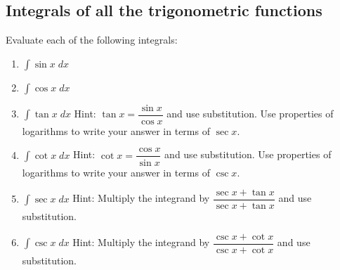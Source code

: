 \documentclass[12pt,letterpaper,fleqn]{article}
\theoremstyle{definition}
\begin{document}
\subsection*{Integrals of all the trigonometric functions}
Evaluate each of the following integrals:
\begin{enumerate}[resume]
  \item $\int\sin x\;dx$
  \item $\int\cos x\;dx$
  \item $\int\tan x\;dx$ Hint: $\tan x = \dfrac{\sin x}{\cos x}$ and use substitution. Use properties of logarithms to write your answer in terms of $\sec x$.
  \item $\int\cot x\;dx$ Hint: $\cot x = \dfrac{\cos x}{\sin x}$ and use substitution. Use properties of logarithms to write your answer in terms of $\csc x$.
  \item $\int\sec x\;dx$ Hint: Multiply the integrand by $\dfrac{\sec x + \tan x}{\sec x + \tan x}$ and use substitution.
  \item $\int\csc x\;dx$ Hint: Multiply the integrand by $\dfrac{\csc x + \cot x}{\csc x + \cot x}$ and use substitution.
\end{enumerate}
%
\end{document}
